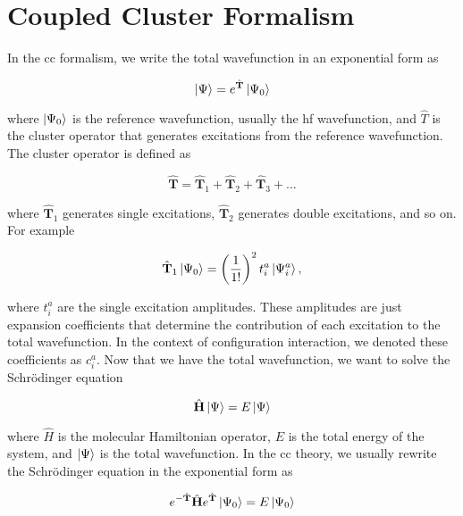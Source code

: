 \documentclass[open=any,parskip=half,11pt]{scrbook}
\begin{document}
\section{Coupled Cluster Formalism}\label{coupled-cluster-formalism}

In the \acrshort{cc} formalism, we write the total wavefunction in an exponential form as

\begin{equation}
\ket{\Psi}=e^{\hat{\mathbf{T}}}\ket{\Psi_0}
\end{equation}

where \(\ket{\Psi_0}\) is the reference wavefunction, usually the \acrshort{hf} wavefunction, and \(\hat{T}\) is the cluster operator that generates excitations from the reference wavefunction. The cluster operator is defined as

\begin{equation}
\hat{\mathbf{T}}=\hat{\mathbf{T}}_1+\hat{\mathbf{T}}_2+\hat{\mathbf{T}}_3+\dots
\end{equation}

where \(\hat{\mathbf{T}}_1\) generates single excitations, \(\hat{\mathbf{T}}_2\) generates double excitations, and so on. For example

\begin{equation}
\hat{\mathbf{T}}_1\ket{\Psi_0}=\left(\frac{1}{1!}\right)^2t_i^a\ket{\Psi_i^a},
\end{equation}

where \(t_i^a\) are the single excitation amplitudes. These amplitudes are just expansion coefficients that determine the contribution of each excitation to the total wavefunction. In the context of configuration interaction, we denoted these coefficients as \(c_i^a\). Now that we have the total wavefunction, we want to solve the Schrödinger equation

\begin{equation}
\hat{\mathbf{H}}\ket{\Psi}=E\ket{\Psi}
\end{equation}

where \(\hat{H}\) is the molecular Hamiltonian operator, \(E\) is the total energy of the system, and \(\ket{\Psi}\) is the total wavefunction. In the \acrshort{cc} theory, we usually rewrite the Schrödinger equation in the exponential form as

\begin{equation}
e^{-\hat{\mathbf{T}}}\hat{\mathbf{H}}e^{\hat{\mathbf{T}}}\ket{\Psi_0}=E\ket{\Psi_0}
\end{equation}
\end{document}
